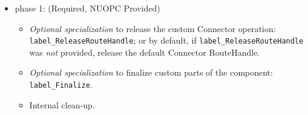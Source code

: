 \begin{itemize}
\item phase 1: ({\sc Required, NUOPC Provided})
  \begin{itemize}
  \item {\it Optional specialization} to release the custom Connector operation: {\tt label\_ReleaseRouteHandle}; or by default, if {\tt label\_ReleaseRouteHandle} was {\em not} provided, release the default Connector RouteHandle.
  \item {\it Optional specialization} to finalize custom parts of the component: {\tt label\_Finalize}.
  \item Internal clean-up.
  \end{itemize}      
\end{itemize}

\mbox{}\hrulefill\ 


